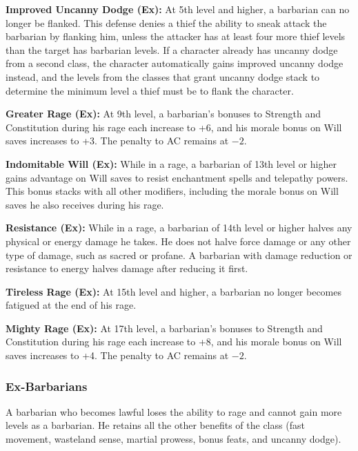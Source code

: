 \textbf{Improved Uncanny Dodge (Ex):} At 5th level and higher, a barbarian can no longer be flanked. This defense denies a thief the ability to sneak attack the barbarian by flanking him, unless the attacker has at least four more thief levels than the target has barbarian levels. If a character already has uncanny dodge from a second class, the character automatically gains improved uncanny dodge instead, and the levels from the classes that grant uncanny dodge stack to determine the minimum level a thief must be to flank the character.

\textbf{Greater Rage (Ex):} At 9th level, a barbarian's bonuses to Strength and Constitution during his rage each increase to +6, and his morale bonus on Will saves increases to +3. The penalty to AC remains at $-2$.

\textbf{Indomitable Will (Ex):} While in a rage, a barbarian of 13th level or higher gains advantage on Will saves to resist enchantment spells and telepathy powers. This bonus stacks with all other modifiers, including the morale bonus on Will saves he also receives during his rage.

\textbf{Resistance (Ex):} While in a rage, a barbarian of 14th level or higher halves any physical or energy damage he takes. He does not halve force damage or any other type of damage, such as sacred or profane. A barbarian with damage reduction or resistance to energy halves damage after reducing it first.

\textbf{Tireless Rage (Ex):} At 15th level and higher, a barbarian no longer becomes fatigued at the end of his rage.

\textbf{Mighty Rage (Ex):} At 17th level, a barbarian's bonuses to Strength and Constitution during his rage each increase to +8, and his morale bonus on Will saves increases to +4. The penalty to AC remains at $-2$.

\subsubsection{Ex-Barbarians}
A barbarian who becomes lawful loses the ability to rage and cannot gain more levels as a barbarian. He retains all the other benefits of the class (fast movement, wasteland sense, martial prowess, bonus feats, and uncanny dodge).



